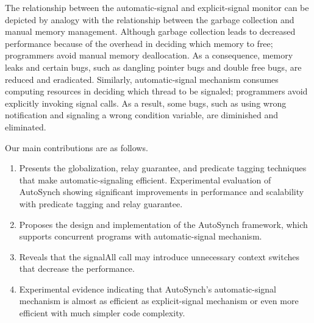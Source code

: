 \documentclass[preprint]{sigplanconf}
\begin{document}
The relationship between the automatic-signal and explicit-signal monitor can be 
depicted by analogy with the relationship between the garbage collection and 
manual memory management. Although garbage collection leads to decreased
performance because of the overhead in deciding which memory to free; programmers 
avoid manual memory deallocation. As a consequence, memory leaks and certain 
bugs, such as dangling pointer bugs and double free bugs, are reduced and 
eradicated. Similarly, automatic-signal mechanism consumes computing resources 
in deciding which thread to be signaled; programmers avoid explicitly invoking 
signal calls. As a result, some bugs, such as using wrong notification and
signaling a wrong condition variable, are diminished and eliminated. 

Our main contributions are as follows.
\begin{enumerate} 
    \item Presents the globalization, relay guarantee, and predicate tagging
        techniques that make automatic-signaling efficient. Experimental 
        evaluation of AutoSynch showing significant improvements in performance 
        and scalability with predicate tagging and relay guarantee. 
    \item Proposes the design and implementation of the AutoSynch framework,
        which supports concurrent programs with automatic-signal mechanism.
    \item Reveals that the signalAll call may introduce unnecessary context
        switches that decrease the performance. 
    \item Experimental evidence indicating that AutoSynch's automatic-signal
        mechanism is almost as efficient as explicit-signal mechanism or even 
        more efficient with much simpler code complexity.
\end{enumerate} 

\end{document}
